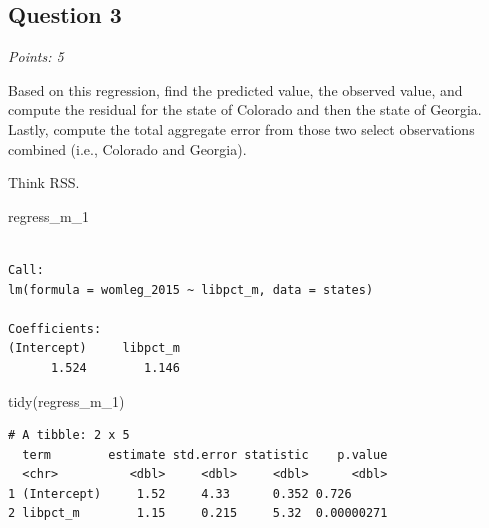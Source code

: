 \documentclass[
  letterpaper,
  DIV=11,
  numbers=noendperiod]{scrartcl}
\newenvironment{Shaded}{\begin{snugshade}}{\end{snugshade}}
\newcommand{\FunctionTok}[1]{\textcolor[rgb]{0.28,0.35,0.67}{#1}}
\newcommand{\NormalTok}[1]{\textcolor[rgb]{0.00,0.23,0.31}{#1}}
\begin{document}
\hypertarget{question-3}{%
\subsection{Question 3}\label{question-3}}

\emph{Points: 5}

Based on this regression, find the predicted value, the observed value,
and compute the residual for the state of Colorado and then the state of
Georgia. Lastly, compute the total aggregate error from those two select
observations combined (i.e., Colorado and Georgia).

\begin{tcolorbox}[enhanced jigsaw, opacitybacktitle=0.6, bottomtitle=1mm, coltitle=black, colback=white, colframe=quarto-callout-tip-color-frame, toprule=.15mm, leftrule=.75mm, breakable, left=2mm, bottomrule=.15mm, toptitle=1mm, arc=.35mm, titlerule=0mm, title=\textcolor{quarto-callout-tip-color}{\faLightbulb}\hspace{0.5em}{Tip}, opacityback=0, colbacktitle=quarto-callout-tip-color!10!white, rightrule=.15mm]

Think RSS.

\end{tcolorbox}

\begin{Shaded}
\begin{Highlighting}[]
\NormalTok{regress\_m\_1}
\end{Highlighting}
\end{Shaded}

\begin{verbatim}

Call:
lm(formula = womleg_2015 ~ libpct_m, data = states)

Coefficients:
(Intercept)     libpct_m  
      1.524        1.146  
\end{verbatim}

\begin{Shaded}
\begin{Highlighting}[]
\FunctionTok{tidy}\NormalTok{(regress\_m\_1)}
\end{Highlighting}
\end{Shaded}

\begin{verbatim}
# A tibble: 2 x 5
  term        estimate std.error statistic    p.value
  <chr>          <dbl>     <dbl>     <dbl>      <dbl>
1 (Intercept)     1.52     4.33      0.352 0.726     
2 libpct_m        1.15     0.215     5.32  0.00000271
\end{verbatim}
\end{document}

